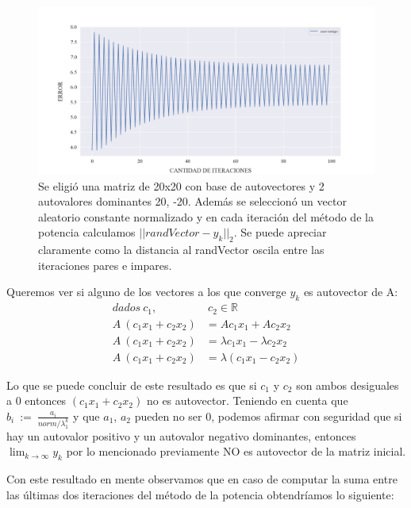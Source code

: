 \begin{figure}[!htbp]
    \includegraphics[scale=0.45]{files/src/.media/op_oscilante.png}
    \caption{Se eligió una matriz de 20x20 con base de autovectores y 2 autovalores dominantes 20, -20. Además se seleccionó un vector aleatorio constante normalizado y en cada iteración del método de la potencia calculamos $||randVector - y_k||_2$. Se puede apreciar claramente como la distancia al randVector oscila entre las iteraciones pares e impares.}
    \label{fig:oscilante}
\end{figure}

\vspace{2em}

Queremos ver si alguno de los vectores a los que converge $y_k$ es autovector de A:
\begin{align}
    dados\ c_1,& \ c_2 \in \mathbb{R} \\
    A \ (c_1 x_1 + c_2 x_2) &= A c_1  x_1 + A c_2 x_2 \\
    A \ (c_1 x_1 + c_2 x_2) &= \lambda c_1  x_1 - \lambda c_2 x_2 \\
    A \ (c_1 x_1 + c_2 x_2) &= \lambda (c_1 x_1 - c_2 x_2) 
\end{align}

Lo que se puede concluir de este resultado es que si $c_1$ y $c_2$ son ambos desiguales a 0 entonces $(c_1 x_1 + c_2 x_2)$ no es autovector. Teniendo en cuenta que $b_i \ := \ \frac{a_i}{norm / \lambda_{1}^{k}}$ y que $a_1$, $a_2$ pueden no ser 0, podemos afirmar con seguridad que si hay un autovalor positivo y un autovalor negativo dominantes, entonces $\lim_{k \to \infty} y_k$ por lo mencionado previamente NO es autovector de la matriz inicial.

\vspace{1em}

Con este resultado en mente observamos que en caso de computar la suma entre las últimas dos iteraciones del método de la potencia obtendríamos lo siguiente:

